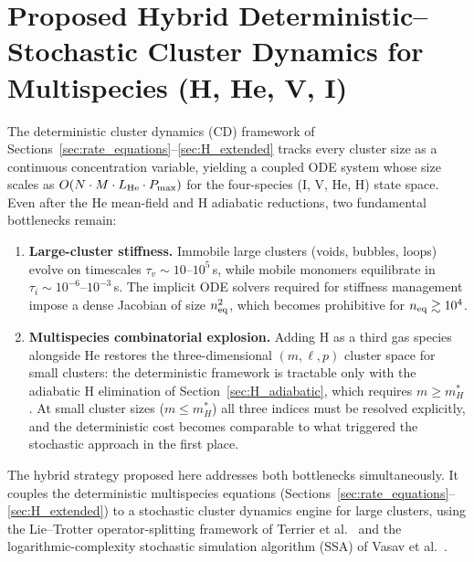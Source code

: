 \documentclass[pdflatex,sn-basic]{sn-jnl} %
\begin{document}
\section{Proposed Hybrid Deterministic--Stochastic Cluster Dynamics
         for Multispecies (H, He, V, I)}
\label{sec:hybrid}

The deterministic cluster dynamics (CD) framework of
Sections~\ref{sec:rate_equations}--\ref{sec:H_extended} tracks
every cluster size as a continuous concentration variable, yielding a
coupled ODE system whose size scales as $O(N \cdot M \cdot L_{\rm He}
\cdot P_{\max})$ for the four-species (I, V, He, H) state space.
Even after the He mean-field and H adiabatic reductions, two
fundamental bottlenecks remain:
\begin{enumerate}
  \item \textbf{Large-cluster stiffness.} Immobile large clusters
        (voids, bubbles, loops) evolve on timescales $\tau_v \sim
        10$--$10^5$\,s, while mobile monomers equilibrate in
        $\tau_i \sim 10^{-6}$--$10^{-3}$\,s. The implicit ODE solvers
        required for stiffness management impose a dense Jacobian of
        size $n_{\rm eq}^2$, which becomes prohibitive for
        $n_{\rm eq} \gtrsim 10^4$.
  \item \textbf{Multispecies combinatorial explosion.} Adding H as a
        third gas species alongside He restores the three-dimensional
        $(m,\ell,p)$ cluster space for small clusters: the deterministic
        framework is tractable only with the adiabatic H elimination of
        Section~\ref{sec:H_adiabatic}, which requires $m \geq m_H^*$.
        At small cluster sizes ($m \leq m_H^*$) all three indices must
        be resolved explicitly, and the deterministic cost becomes
        comparable to what triggered the stochastic approach in the
        first place.
\end{enumerate}

The hybrid strategy proposed here addresses both bottlenecks
simultaneously.  It couples the deterministic multispecies equations
(Sections~\ref{sec:rate_equations}--\ref{sec:H_extended}) to a
stochastic cluster dynamics engine for large clusters, using the
Lie--Trotter operator-splitting framework of Terrier
et al.~\cite{Terrier2017} and the logarithmic-complexity
stochastic simulation algorithm (SSA) of Vasav
et al.~\cite{Vasav2026}.

\end{document}
